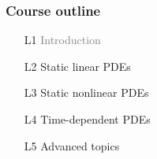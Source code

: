 \begin{frame}
  \frametitle{Course outline}

  \begin{enumerate}
  \item[L1]
    \textcolor{grey}{Introduction}
  \item[L2]
    Static linear PDEs
  \item[L3]
    Static nonlinear PDEs
  \item[L4]
    Time-dependent PDEs
  \item[L5]
    Advanced topics
  \end{enumerate}

\end{frame}
